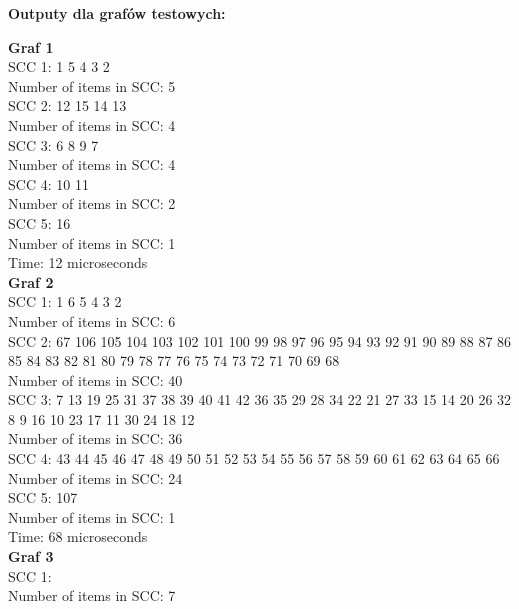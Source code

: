 \documentclass[15pt, a4paper]{article}
\begin{document}
\begin{center}
    \textbf{Outputy dla grafów testowych:}
\end{center}

\textbf{Graf 1} \\
SCC 1: 1 5 4 3 2 \\
Number of items in SCC: 5 \\

SCC 2: 12 15 14 13 \\
Number of items in SCC: 4 \\

SCC 3: 6 8 9 7 \\
Number of items in SCC: 4 \\

SCC 4: 10 11 \\
Number of items in SCC: 2 \\

SCC 5: 16 \\
Number of items in SCC: 1 \\

Time: 12 microseconds \\

\textbf{Graf 2} \\
SCC 1: 1 6 5 4 3 2 \\
Number of items in SCC: 6 \\

SCC 2: 67 106 105 104 103 102 101 100 99 98 97 96 95 94 93 92 91 90 89 88 87 86 85 84 83 82 81 80 79 78 77 76 75 74 73 72 71 70 69 68 \\
Number of items in SCC: 40 \\

SCC 3: 7 13 19 25 31 37 38 39 40 41 42 36 35 29 28 34 22 21 27 33 15 14 20 26 32 8 9 16 10 23 17 11 30 24 18 12 \\
Number of items in SCC: 36 \\

SCC 4: 43 44 45 46 47 48 49 50 51 52 53 54 55 56 57 58 59 60 61 62 63 64 65 66 \\
Number of items in SCC: 24 \\

SCC 5: 107 \\
Number of items in SCC: 1 \\

Time: 68 microseconds \\

\textbf{Graf 3} \\
SCC 1: \\
Number of items in SCC: 7 \\
\end{document}
